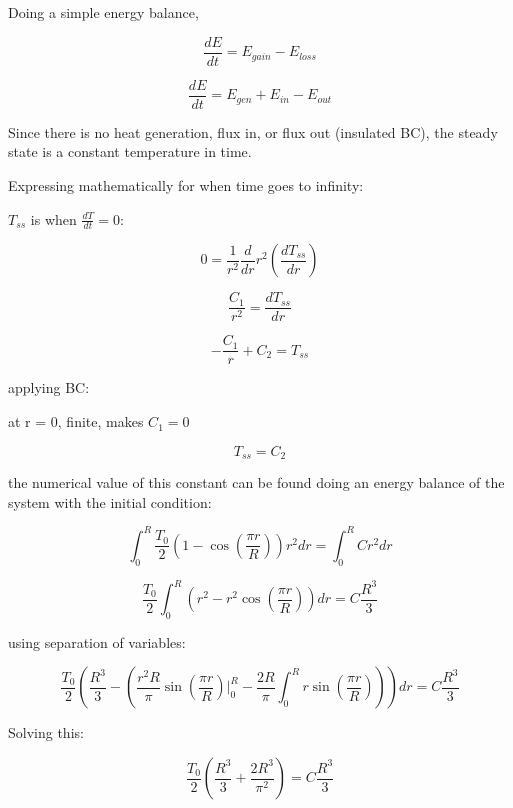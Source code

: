 \documentclass[12pt,letterpaper]{article}
\begin{document}
Doing a simple energy balance,

\[\frac{dE}{dt} = E_{gain} - E_{loss}\]

\[\frac{dE}{dt} = E_{gen} + E_{in} - E_{out}\]

Since there is no heat generation, flux in, or flux out (insulated BC),
the steady state is a constant temperature in time.


Expressing mathematically for when time goes to infinity:

$T_{ss}$ is when $\frac{dT}{dt} = 0 $:

\[0 = \frac{1}{r^2} \frac{d}{dr} r^2 (\frac{dT_{ss}}{dr})\]

\[\frac{C_1}{r^2} = \frac{dT_{ss}}{dr}\]

\[-\frac{C_1}{r} + C_2 = T_{ss}\]

applying BC:

at r = 0, finite, makes  $C_1 = 0$

\[T_{ss} = C_2\]

the numerical value of this constant can be found doing an energy balance
of the system with the initial condition:

\[\int_{0}^{R} \frac{T_0}{2} (1-\cos(\frac{\pi r}{R})) r^2 dr = \int_{0}^{R} C r^2 dr \]

\[\frac{T_0}{2} \int_{0}^{R}  (r^2-r^2\cos(\frac{\pi r}{R})) dr = C \frac{R^3}{3} \]

using separation of variables:

\[\frac{T_0}{2} ( \frac{R^3}{3} - (\frac{r^2 R}{\pi} \sin(\frac{\pi r}{R})\Big|_0^R - \frac{2R}{\pi} \int_0^R r \sin(\frac{\pi r}{R})))dr = C \frac{R^3}{3}\]

Solving this:

\[\frac{T_0}{2} (\frac{R^3}{3} + \frac{2R^3}{\pi ^2}) = C \frac{R^3}{3} \]
\end{document}
